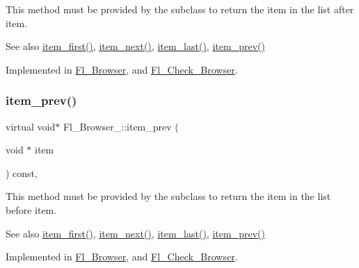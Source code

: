 This method must be provided by the subclass to return the item in the list after {\ttfamily item}. \begin{DoxySeeAlso}{See also}
\hyperlink{class_fl___browser___a43dd6231f2684f132a5a33b5d7d0c8e7}{item\+\_\+first()}, \hyperlink{class_fl___browser___aca6035552f5e9ecbeaa6caaf5fb8a3cb}{item\+\_\+next()}, \hyperlink{class_fl___browser___a2302bec54f4ea593146be5490a7fe93b}{item\+\_\+last()}, \hyperlink{class_fl___browser___afeb24ca0dbd8e4685fa18382512c94d3}{item\+\_\+prev()} 
\end{DoxySeeAlso}


Implemented in \hyperlink{class_fl___browser_aca0d9393c07552ce4ee75a9a10dbe93e}{Fl\+\_\+\+Browser}, and \hyperlink{class_fl___check___browser_a7d270e0fd9e92b80f84fdf55e652fbb4}{Fl\+\_\+\+Check\+\_\+\+Browser}.

\mbox{\label{class_fl___browser___afeb24ca0dbd8e4685fa18382512c94d3}} 
\subsubsection{\texorpdfstring{item\+\_\+prev()}{item\_prev()}}
{\footnotesize\ttfamily virtual void$\ast$ Fl\+\_\+\+Browser\+\_\+\+::item\+\_\+prev (\begin{DoxyParamCaption}\item[{void $\ast$}]{item }\end{DoxyParamCaption}) const\hspace{0.3cm}{\ttfamily [protected]}, {}}

This method must be provided by the subclass to return the item in the list before {\ttfamily item}. \begin{DoxySeeAlso}{See also}
\hyperlink{class_fl___browser___a43dd6231f2684f132a5a33b5d7d0c8e7}{item\+\_\+first()}, \hyperlink{class_fl___browser___aca6035552f5e9ecbeaa6caaf5fb8a3cb}{item\+\_\+next()}, \hyperlink{class_fl___browser___a2302bec54f4ea593146be5490a7fe93b}{item\+\_\+last()}, \hyperlink{class_fl___browser___afeb24ca0dbd8e4685fa18382512c94d3}{item\+\_\+prev()} 
\end{DoxySeeAlso}


Implemented in \hyperlink{class_fl___browser_a0fbf4d057bc1b7afcdd872b78ee8526b}{Fl\+\_\+\+Browser}, and \hyperlink{class_fl___check___browser_ad181ae65962d13d6409723742080db82}{Fl\+\_\+\+Check\+\_\+\+Browser}.


